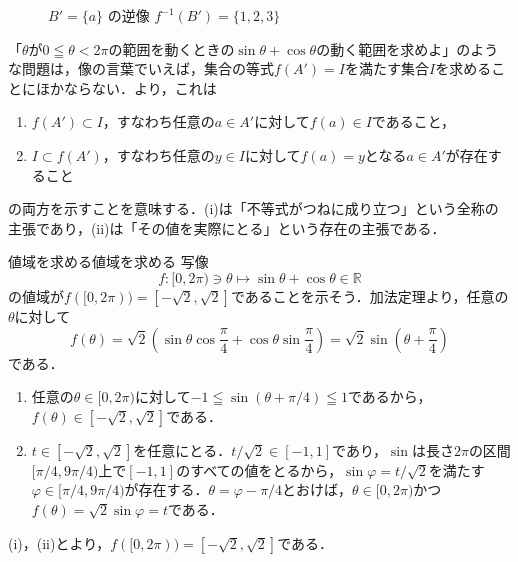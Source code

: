 \begin{figure}[ht]
\begin{minipage}[t]{0.48\linewidth}
    \caption{$B' = \{a\}$ の逆像 $f^{-1}(B') = \{1, 2, 3\}$}
  \end{minipage}
\end{figure}

「$\theta$が$0 \leqq \theta < 2\pi$の範囲を動くときの$\sin \theta + \cos \theta$の動く範囲を求めよ」のような問題は，像の言葉でいえば，集合の等式$f(A') = I$を満たす集合$I$を求めることにほかならない．より，これは
\begin{enumerate}[label=(\roman*),leftmargin=3.2em]
  \item $f(A') \subset I$，すなわち任意の$a \in A'$に対して$f(a) \in I$であること，
  \item $I \subset f(A')$，すなわち任意の$y \in I$に対して$f(a) = y$となる$a \in A'$が存在すること
\end{enumerate}
の両方を示すことを意味する．(i)は「不等式がつねに成り立つ」という全称の主張であり，(ii)は「その値を実際にとる」という存在の主張である．

\begin{example}{値域を求める}{値域を求める}
  写像
  \[
    f \colon [0, 2\pi) \ni \theta \mapsto \sin \theta + \cos \theta \in \mathbb{R}
  \]
  の値域が$f([0, 2\pi)) = [-\sqrt{2}, \sqrt{2}]$であることを示そう．加法定理より，任意の$\theta$に対して
  \[
    f(\theta) = \sqrt{2} \left( \sin \theta \cos \frac{\pi}{4} + \cos \theta \sin \frac{\pi}{4} \right) = \sqrt{2} \sin \left( \theta + \frac{\pi}{4} \right)
  \]
  である．
  \begin{enumerate}[label=(\roman*),leftmargin=3.2em]
    \item 任意の$\theta \in [0, 2\pi)$に対して$-1 \leqq \sin(\theta + \pi/4) \leqq 1$であるから，$f(\theta) \in [-\sqrt{2}, \sqrt{2}]$である．
    \item $t \in [-\sqrt{2}, \sqrt{2}]$を任意にとる．$t / \sqrt{2} \in [-1, 1]$であり，$\sin$は長さ$2\pi$の区間$[\pi/4, 9\pi/4)$上で$[-1, 1]$のすべての値をとるから，$\sin \varphi = t / \sqrt{2}$を満たす$\varphi \in [\pi/4, 9\pi/4)$が存在する．$\theta = \varphi - \pi/4$とおけば，$\theta \in [0, 2\pi)$かつ$f(\theta) = \sqrt{2} \sin \varphi = t$である．
  \end{enumerate}
  (i)，(ii)とより，$f([0, 2\pi)) = [-\sqrt{2}, \sqrt{2}]$である．
\end{example}


